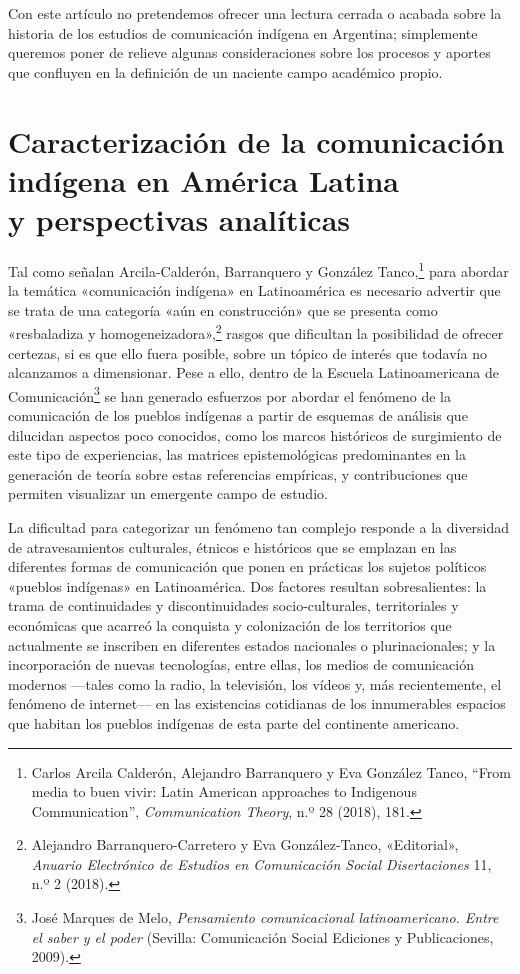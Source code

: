 \documentclass{tufte-handout}
\begin{document}
Con este artículo no pretendemos ofrecer una lectura cerrada o acabada
sobre la historia de los estudios de comunicación indígena en Argentina;
simplemente queremos poner de relieve algunas consideraciones sobre los
procesos y aportes que confluyen en la definición de un naciente campo
académico propio.

\hypertarget{caracterizacin-de-la-comunicacin-indgena-en-amrica-latina-y-perspectivas-analticas}{%
\section{Caracterización de la comunicación indígena en América
Latina\\\noindent y perspectivas
analíticas}\label{caracterizacin-de-la-comunicacin-indgena-en-amrica-latina-y-perspectivas-analticas}}

Tal como señalan Arcila-Calderón, Barranquero y González
Tanco,\footnote{Carlos Arcila Calderón, Alejandro Barranquero y Eva
  González Tanco, ``From media to buen vivir: Latin American approaches
  to Indigenous Communication'', \emph{Communication Theory}, n.º 28
  (2018), 181.} para abordar la temática «comunicación indígena» en
Latinoamérica es necesario advertir que se trata de una categoría «aún
en construcción» que se presenta como «resbaladiza y
homogeneizadora»,\footnote{Alejandro Barranquero-Carretero y Eva
  González-Tanco, «Editorial», \emph{Anuario Electrónico de Estudios en
  Comunicación Social Disertaciones} 11, n.º 2 (2018).} rasgos que
dificultan la posibilidad de ofrecer certezas, si es que ello fuera
posible, sobre un tópico de interés que todavía no alcanzamos a
dimensionar. Pese a ello, dentro de la Escuela Latinoamericana de
Comunicación\footnote{José Marques de Melo, \emph{Pensamiento
  comunicacional latinoamericano. Entre el saber y el poder} (Sevilla:
  Comunicación Social Ediciones y Publicaciones, 2009).} se han generado
esfuerzos por abordar el fenómeno de la comunicación de los pueblos
indígenas a partir de esquemas de análisis que dilucidan aspectos poco
conocidos, como los marcos históricos de surgimiento de este tipo de
experiencias, las matrices epistemológicas predominantes en la
generación de teoría sobre estas referencias empíricas, y contribuciones
que permiten visualizar un emergente campo de estudio.

\pagebreak La dificultad para categorizar un fenómeno tan complejo responde a la
diversidad de atravesamientos culturales, étnicos e históricos que se
emplazan en las diferentes formas de comunicación que ponen en prácticas
los sujetos políticos «pueblos indígenas» en Latinoamérica. Dos factores
resultan sobresalientes: la trama de continuidades y discontinuidades
socio-culturales, territoriales y económicas que acarreó la conquista y
colonización de los territorios que actualmente se inscriben en
diferentes estados nacionales o plurinacionales; y la incorporación de
nuevas tecnologías, entre ellas, los medios de comunicación modernos
---tales como la radio, la televisión, los vídeos y, más recientemente,
el fenómeno de internet--- en las existencias cotidianas de los
innumerables espacios que habitan los pueblos indígenas de esta parte
del continente americano.
\end{document}
